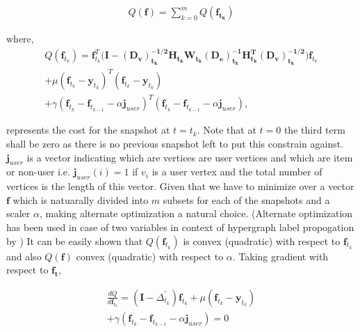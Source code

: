 \documentclass[conference]{IEEEtran}
\begin{document}
\begin{equation}
\begin{align}
Q(\mathbf{f}) = \sum_{k=0}^{m} Q(\mathbf{f_{t_k}})
\end{align}
\end{equation}

where, 
\begin{equation}
\begin{align}
Q(\mathbf{f}_{t_k}) = \mathbf{f}_{t_k}^{T}(\mathbf{I} - \mathbf{(D_v)_{t_k}^{-1/2}}\mathbf{H_{t_k}}\mathbf{W_{t_k}}\mathbf{(D_e)_{t_k}^{-1}}\mathbf{H_{t_k}^{T}}\mathbf{(D_v)_{t_k}^{-1/2})} \mathbf{f}_{t_k} \\ + \mu (\mathbf{f}_{t_k} - \mathbf{y}_{t_k})^{T} (\mathbf{f}_{t_k} - \mathbf{y}_{t_k}) \\ + \gamma (\mathbf{f}_{t_k} - \mathbf{f}_{t_{k-1}} - \alpha \mathbf{j}_{user})^{T} (\mathbf{f}_{t_k} - \mathbf{f}_{t_{k-1}} - \alpha \mathbf{j}_{user}), 
\end{align}
\end{equation}

represents the cost for the snapshot at $t=t_k$. Note that at $t=0$ the third term shall be zero as there is no previous snapshot left to put this constrain against.
$\mathbf{j}_{user}$ is a vector indicating which are vertices are user vertices and which are item or non-user i.e. $\mathbf{j}_{user}(i)=1$ if $v_i $ is a user vertex and the total number of vertices is the length of this vector. Given that we have to minimize over a vector $\mathbf{f}$ which is natuarally divided into $m$ subsets for each of the snapshots and a scaler $\alpha$, making alternate optimization \cite{Bezdek02} a natural choice. (Alternate optimization has been used in case of two variables in context of hypergraph label propogation by \cite{kuang09}) It can be easily shown that $Q(\mathbf{f}_{t_k})$ is convex (quadratic) with respect to $\mathbf{f}_{t_k}$ and also $Q(\mathbf{f})$ convex (quadratic) with respect to $\alpha$. Taking gradient with respect to $\mathbf{f_t}$, 

\begin{equation}
\begin{align}
\frac{dQ}{d\mathbf{f}_{t_k}} = (\mathbf{I} - \Delta^{'}_{t_k})\mathbf{f}_{t_k} + \mu(\mathbf{f}_{t_k} - \mathbf{y}_{t_k}) \\ + \gamma(\mathbf{f}_{t_k}-\mathbf{f}_{t_{k-1}}-\alpha \mathbf{j}_{user}) = 0
\end{align}
\end{equation}
\end{document}
